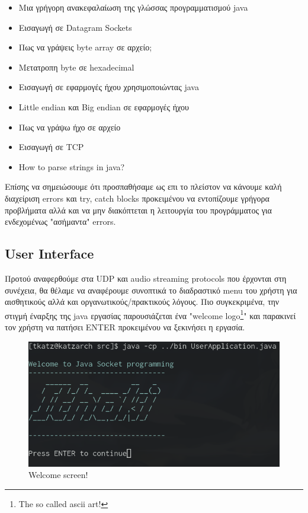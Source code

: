 \documentclass[hidelinks, 12pt, a4paper]{article}
\begin{document}
\begin{itemize}
    \item Μια γρήγορη ανακεφαλαίωση της γλώσσας προγραμματισμού java \cite{derek}
    \item Εισαγωγή σε Datagram Sockets \cite{romaniancoder, oracle}
    \item Πως να γράψεις byte array σε αρχείο; \cite{javafile}
    \item Μετατροπη byte σε hexadecimal \cite{programizhex}
    \item Εισαγωγή σε εφαρμογές ήχου χρησιμοποιώντας java \cite{oraclesound}
    \item Little endian και Big endian σε εφαρμογές ήχου \cite{stackendian}
    \item Πως να γράψω ήχο σε αρχείο \cite{stackaudiofile}
    \item Εισαγωγή σε TCP \cite{tutorpoints, mediumtcp, codejava}
    \item How to parse strings in java? \cite{stackparsestring}
\end{itemize}


Επίσης να σημειώσουμε ότι προσπαθήσαμε ως επι το πλείστον να κάνουμε καλή διαχείριση errors και try, catch blocks προκειμένου να εντοπίζουμε γρήγορα προβλήματα αλλά και να μην διακόπτεται η λειτουργία του προγράμματος για ενδεχομένως "ασήμαντα" errors.

\subsection{User Interface}

Προτού αναφερθούμε στα UDP και audio streaming protocols που έρχονται στη συνέχεια, θα θέλαμε να αναφέρουμε συνοπτικά το διαδραστικό menu του χρήστη για αισθητικούς αλλά και οργανωτικούς/πρακτικούς λόγους. Πιο συγκεκριμένα, την στιγμή έναρξης της java εργασίας παρουσιάζεται ένα "welcome logo\footnote{The so called ascii art!}" και παρακινεί τον χρήστη να πατήσει ENTER προκειμένου να ξεκινήσει η εργασία.

\begin{figure}[h!]
\centering
	\includegraphics[height=.3\textheight, width=\textwidth]{assets/ui_welcome.png}
	\caption{Welcome screen!} 
    \label{fig:ui}
\end{figure}
\end{document}
